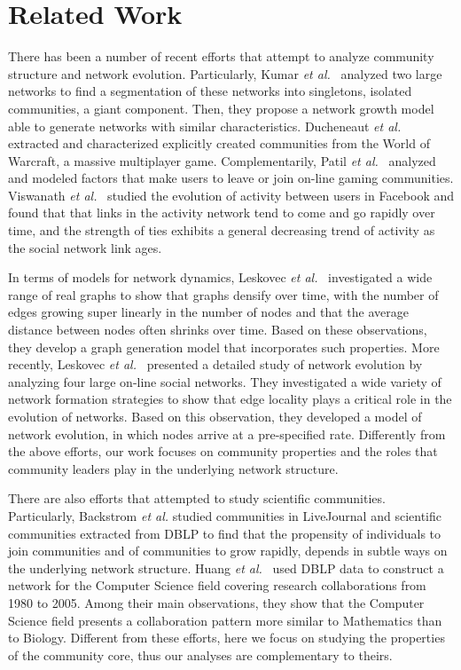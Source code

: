 \section{Related Work}


There has been a number of recent efforts that attempt to analyze community structure and network evolution.  Particularly, Kumar \textit{et al.}~\cite{Kumar:2006} analyzed two large networks to
find a segmentation of these networks into singletons, isolated communities, a giant component. Then, they propose a network growth model able to generate networks with similar
characteristics.  Ducheneaut \textit{et al.}~\cite{Ducheneaut:2007} extracted and characterized explicitly created communities from the World of Warcraft, a massive multiplayer game.
Complementarily, Patil \textit{et al.}~\cite{Patil:2012} analyzed and modeled factors that make users to leave or join on-line gaming communities.  Viswanath \textit{et
al.}~\cite{Viswanath:2009} studied the evolution of activity between users in Facebook and found that that links in the activity network tend to come and go rapidly over time, and
the strength of ties exhibits a general decreasing trend of activity as the social network link ages.

In terms of models for network dynamics, Leskovec \textit{et al.}~\cite{Leskovec:2005} investigated a wide range of real graphs to show that graphs densify over time, with the
number of edges growing super linearly in the number of nodes and that the average distance between nodes often shrinks over time. Based on these observations, they develop a graph
generation model that incorporates such properties.  More recently, Leskovec \textit{et al.}~\cite{Leskovec:2008} presented a detailed study of network evolution by analyzing four
large on-line social networks.  They investigated a wide variety of network formation strategies to show that edge locality plays a critical role in the evolution of networks. Based on
this observation, they developed a model of network evolution, in which nodes arrive at a pre-specified rate.  Differently from the above efforts, our work focuses on community
properties and the roles that community leaders play in the underlying network structure.

There are also efforts that attempted to study scientific communities. Particularly, Backstrom \textit{et al.}\cite{Backstrom:2006} studied communities in LiveJournal and
scientific communities extracted from DBLP to find that the propensity of individuals to join communities and of communities to grow rapidly, depends in subtle ways on the
underlying network structure. Huang \textit{et al.}~\cite{Huang:2008} used DBLP data to construct a network for the Computer Science field covering research collaborations from
1980 to 2005. Among their main observations, they show that the Computer Science field presents a collaboration pattern more similar to Mathematics than to Biology.  
Different from these efforts, here we focus on studying the properties of the community core, thus our analyses are complementary to
theirs.

